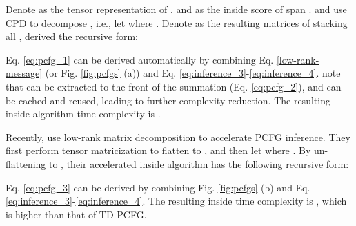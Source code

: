 \documentclass[11pt]{article}
\begin{document}
Denote  as the tensor representation of  , and  as the inside score of span . 
\citet{cohen-etal-2013-approximate} and \citet{yang-etal-2021-pcfgs} use CPD to decompose , i.e., let  where . Denote  as the resulting matrices of stacking all  , \citet{cohen-etal-2013-approximate} derived the recursive form:



Eq. \ref{eq:pcfg_1} can be derived automatically by combining Eq. \ref{low-rank-message} (or Fig. \ref{fig:pcfgs} (a)) and Eq. \ref{eq:inference_3}-\ref{eq:inference_4}.  \citet{cohen-etal-2013-approximate} note that  can be extracted to the front of the summation (Eq. \ref{eq:pcfg_2}), and  can be cached and reused, leading to further complexity reduction. The resulting inside algorithm time complexity is .

Recently, \citet{chiu2021low} use low-rank matrix decomposition to accelerate PCFG inference. They first perform  tensor matricization to flatten  to  , and then let  where . By un-flattening  to , their accelerated inside algorithm has the following recursive form:

Eq. \ref{eq:pcfg_3} can be derived by combining Fig. \ref{fig:pcfgs} (b) and Eq. \ref{eq:inference_3}-\ref{eq:inference_4}. The resulting inside time complexity is , which is higher than that of TD-PCFG.
\end{document}
